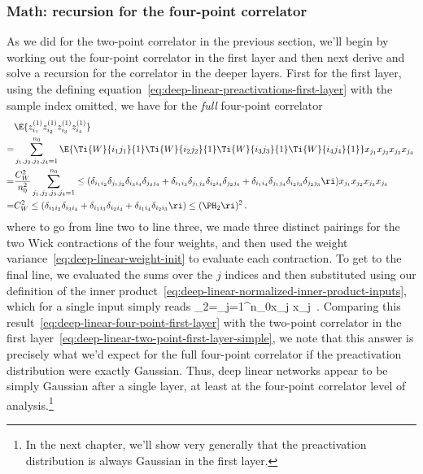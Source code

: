 \subsubsection{Math: recursion for the four-point correlator}
As we did for the two-point correlator in the previous section, we'll begin by working out the four-point correlator in the first layer and 
then next derive and solve a recursion for the correlator in the deeper layers.
First for the first layer, using the defining equation~\eqref{eq:deep-linear-preactivations-first-layer} with the sample index omitted,
we have
for the \emph{full} four-point correlator
\begin{align}\label{eq:deep-linear-four-point-first-layer}
&\E{z_{i_1}^{(1)}z_{i_2}^{(1)}z_{i_3}^{(1)}z_{i_4}^{(1)}}\, \\
=&\sum_{j_1,j_2,j_3,j_4=1}^{n_0}\E{\Ti{W}{i_1j_1}{1}\Ti{W}{i_2j_2}{1}\Ti{W}{i_3j_3}{1}\Ti{W}{i_4j_4}{1}}x_{j_1}x_{j_2}x_{j_3}x_{j_4}\, \nonumber\\
=&\frac{C_W^2}{n_0^2}\sum_{j_1,j_2,j_3,j_4=1}^{n_0}\le(\delta_{i_1i_2}\delta_{j_1j_2}\delta_{i_3i_4}\delta_{j_3j_4}+\delta_{i_1i_3}\delta_{j_1j_3}\delta_{i_2i_4}\delta_{j_2j_4}+\delta_{i_1i_4}\delta_{j_1j_4}\delta_{i_2i_3}\delta_{j_2j_3}\ri)x_{j_1}x_{j_2}x_{j_3}x_{j_4}\, \nonumber\\
=&C_W^2  \le(\delta_{i_1i_2}\delta_{i_3i_4}+\delta_{i_1i_3}\delta_{i_2i_4}+\delta_{i_1i_4}\delta_{i_2i_3}\ri)\le(\PH_2\ri)^2\, \notag.
\end{align}
where to go from line two to line three, we made three distinct pairings for the two Wick contractions of the four weights, 
and then used the weight variance~\eqref{eq:deep-linear-weight-init} to evaluate each contraction.
To get to the final line, we evaluated the sums over the $j$ indices and then substituted using our definition of the inner product~\eqref{eq:deep-linear-normalized-inner-product-inputs}, which 
for a single input simply reads
\be
\PH_2=\sum_{j=1}^{n_0}x_j x_j\, .
\ee
Comparing this result~\eqref{eq:deep-linear-four-point-first-layer} with the two-point correlator in the first layer~\eqref{eq:deep-linear-two-point-first-layer-simple}, we note that this answer is precisely what we'd expect for the full four-point correlator if the preactivation distribution were exactly Gaussian. Thus, deep linear networks appear to be simply Gaussian after a single layer, at least at the four-point correlator level of analysis.\footnote{In the next chapter, we'll show very generally that the preactivation distribution is always Gaussian in the first layer.}

